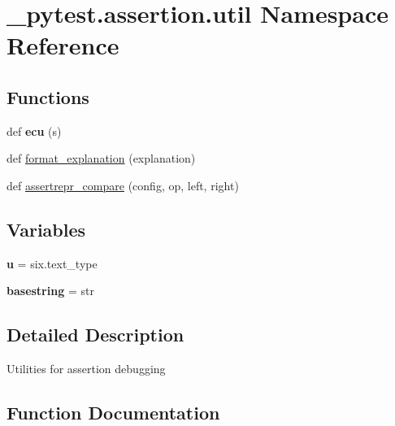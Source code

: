 \hypertarget{namespace__pytest_1_1assertion_1_1util}{}\section{\+\_\+pytest.\+assertion.\+util Namespace Reference}
\label{namespace__pytest_1_1assertion_1_1util}
\subsection*{Functions}
\begin{DoxyCompactItemize}
\item 
\mbox{\label{namespace__pytest_1_1assertion_1_1util_ad0605375340ad2630bb26ecc5cda6c61}} 
def {\bfseries ecu} (s)
\item 
def \hyperlink{namespace__pytest_1_1assertion_1_1util_ad86c7efa3854a6f81fb8b8f7ccc66e79}{format\+\_\+explanation} (explanation)
\item 
def \hyperlink{namespace__pytest_1_1assertion_1_1util_a0d808117a2ab9db3c81e7bf8c2e2fe0c}{assertrepr\+\_\+compare} (config, op, left, right)
\end{DoxyCompactItemize}
\subsection*{Variables}
\begin{DoxyCompactItemize}
\item 
\mbox{\label{namespace__pytest_1_1assertion_1_1util_aba9f931c69360af81ebbcb708f49b2b6}} 
{\bfseries u} = six.\+text\+\_\+type
\item 
\mbox{\label{namespace__pytest_1_1assertion_1_1util_a76ee30f29200bb0ef3e49f6ae17de424}} 
{\bfseries basestring} = str
\end{DoxyCompactItemize}


\subsection{Detailed Description}
\begin{DoxyVerb}Utilities for assertion debugging\end{DoxyVerb}
 

\subsection{Function Documentation}
\mbox{\label{namespace__pytest_1_1assertion_1_1util_a0d808117a2ab9db3c81e7bf8c2e2fe0c}} 

